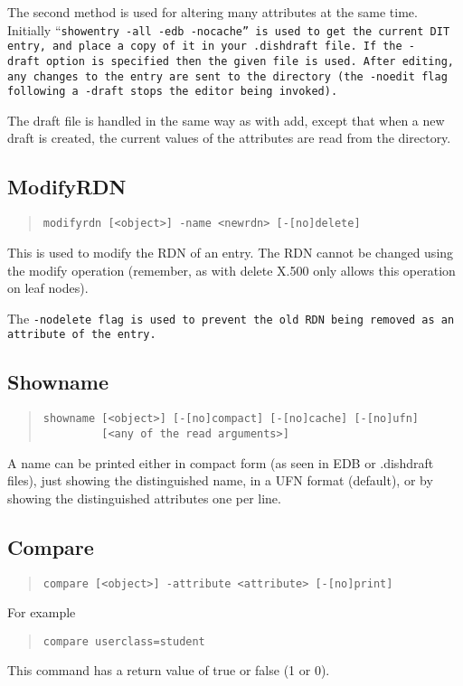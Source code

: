 The second method is used for altering many attributes at the same time.
Initially ``\tt showentry -all -edb -nocache\rm ''
is used to get the current DIT entry, and place a copy of it in your
.dishdraft file.  If the \tt -draft\rm \ option is 
specified then the given file is used.
After editing, any changes to the entry are sent to the directory
(the \tt -noedit\rm \ flag following a \tt -draft\rm \ stops the editor
being invoked).

The draft file is handled in the same way as with add, except that when a
new draft is created, the current values of the attributes are read from the
directory.

\subsection {ModifyRDN}
\begin{quote}\begin{verbatim}
modifyrdn [<object>] -name <newrdn> [-[no]delete]
\end{verbatim}\end{quote}
This is used to modify the RDN of an entry.
The RDN cannot be changed using the modify operation (remember, as
with delete X.500 only allows this operation on leaf nodes).

The \tt -nodelete\rm \ flag is used to prevent the old RDN being removed as
an attribute of the entry.


\subsection{Showname}
\label{showname}

\begin{quote}\begin{verbatim}
showname [<object>] [-[no]compact] [-[no]cache] [-[no]ufn]
         [<any of the read arguments>]
\end{verbatim}\end{quote}

A name can be printed either in compact form (as seen in EDB or
.dishdraft files), just showing the distinguished
name, in a UFN format (default), or by showing the distinguished
attributes one per line.

\subsection{Compare}
\label{dua:compare}
\begin{quote}\begin{verbatim}
compare [<object>] -attribute <attribute> [-[no]print]
\end{verbatim}\end{quote}
For example
\begin{quote}\begin{verbatim}
compare userclass=student
\end{verbatim}\end{quote}
This command has a return value of true or false (1 or 0).


